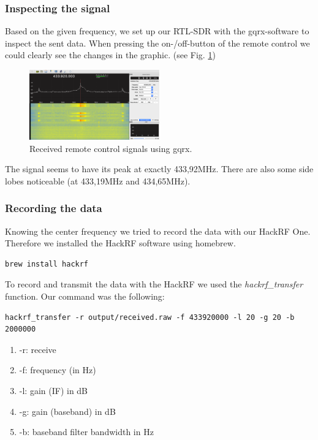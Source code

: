 \documentclass[conference]{IEEEtran}
\begin{document}
\subsubsection{Inspecting the signal}
Based on the given frequency, we set up our RTL-SDR with the gqrx-software to inspect the sent data. When pressing the on-/off-button of the remote control we could clearly see the changes in the graphic. (see Fig. \ref{fig:remote_gqrx})


\begin{figure}[H]
	\centering
	\includegraphics[width=0.5\textwidth]{gqrx_remote_control}
	\caption{Received remote control signals using gqrx.}
	\label{fig:remote_gqrx}
\end{figure}

The signal seems to have its peak at exactly 433,92MHz. There are also some side lobes noticeable (at 433,19MHz and 434,65MHz). 
\\
\subsubsection{Recording the data}
Knowing the center frequency we tried to record the data with our HackRF One.  Therefore we installed the HackRF software \cite{hackrfsoftware} using homebrew.
\begin{lstlisting}
brew install hackrf
\end{lstlisting}

To record and transmit the data with the HackRF we used the \textit{hackrf\_transfer} function. Our command was the following:
\begin{lstlisting}
hackrf_transfer -r output/received.raw -f 433920000 -l 20 -g 20 -b 2000000
\end{lstlisting}
\begin{enumerate}
	\item -r: receive
	\item -f: frequency (in Hz)
	\item -l: gain (IF) in dB
	\item -g: gain (baseband) in dB
	\item -b: baseband filter bandwidth in Hz
\end{enumerate}
\bigbreak
\end{document}
